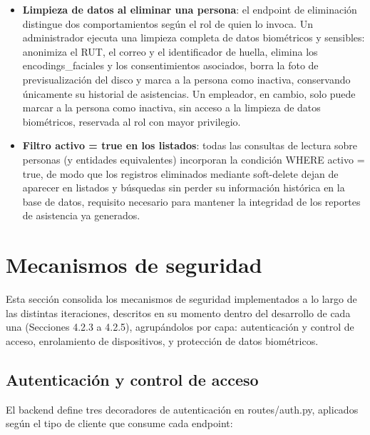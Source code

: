 \begin{itemize}
    \item \textbf{Limpieza de datos al eliminar una persona}: el endpoint de eliminación distingue dos comportamientos según el rol de quien lo invoca. Un administrador ejecuta una limpieza completa de datos biométricos y sensibles: anonimiza el RUT, el correo y el identificador de huella, elimina los encodings\_faciales y los consentimientos asociados, borra la foto de previsualización del disco y marca a la persona como inactiva, conservando únicamente su historial de asistencias. Un empleador, en cambio, solo puede marcar a la persona como inactiva, sin acceso a la limpieza de datos biométricos, reservada al rol con mayor privilegio.

    \item \textbf{Filtro activo = true en los listados}: todas las consultas de lectura sobre personas (y entidades equivalentes) incorporan la condición WHERE activo = true, de modo que los registros eliminados mediante soft-delete dejan de aparecer en listados y búsquedas sin perder su información histórica en la base de datos, requisito necesario para mantener la integridad de los reportes de asistencia ya generados.
\end{itemize}


\section{Mecanismos de seguridad}

Esta sección consolida los mecanismos de seguridad implementados a lo largo de las distintas iteraciones, descritos en su momento dentro del desarrollo de cada una (Secciones 4.2.3 a 4.2.5), agrupándolos por capa: autenticación y control de acceso, enrolamiento de dispositivos, y protección de datos biométricos.

\subsection{Autenticación y control de acceso}

El backend define tres decoradores de autenticación en routes/auth.py, aplicados según el tipo de cliente que consume cada endpoint:

